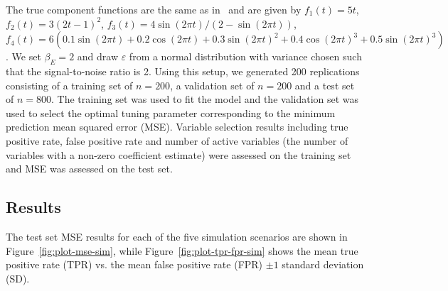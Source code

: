 \documentclass[12pt,letter]{article}\usepackage[]{graphicx}\usepackage[]{color}
\begin{document}
The true component functions are the same as in~\citep{lin2006component,huang2010variable} and are given by $f_1(t) = 5t$, $f_2(t) = 3(2t-1)^2$, $f_3(t) = 4\sin(2\pi t) / (2-\sin(2\pi t))$, $f_4(t) = 6(0.1\sin(2\pi t) + 0.2 \cos(2\pi t)  + 0.3 \sin(2\pi t)^2 + 0.4\cos(2\pi t)^3+0.5\sin(2\pi t)^3)$. We set $\beta_E = 2$ and draw $\varepsilon$ from a normal distribution with variance chosen such that the signal-to-noise ratio is 2. Using this setup, we generated 200 replications consisting of a training set of $n=200$, a validation set of $n=200$ and a test set of $n=800$. The training set was used to fit the model and the validation set was used to select the optimal tuning parameter corresponding to the minimum prediction mean squared error (MSE). Variable selection results including true positive rate, false positive rate and number of active variables (the number of variables with a non-zero coefficient estimate) were assessed on the training set and MSE was assessed on the test set. %

\subsection{Results}

The test set MSE results for each of the five simulation scenarios are shown in Figure~\ref{fig:plot-mse-sim}, while Figure~\ref{fig:plot-tpr-fpr-sim} shows the mean true positive rate (TPR) vs. the mean false positive rate (FPR) $\pm 1$ standard deviation (SD). 
\end{document}
